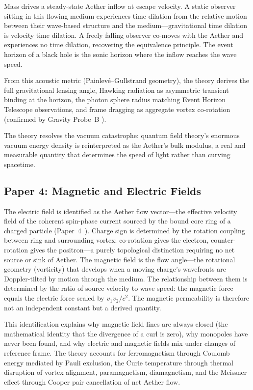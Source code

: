 \documentclass[12pt,letterpaper]{article}
\begin{document}
Mass drives a steady-state Aether inflow at escape velocity.  A static observer
sitting in this flowing medium experiences time dilation from the relative motion
between their wave-based structure and the medium---gravitational time dilation is
velocity time dilation.  A freely falling observer co-moves with the Aether and
experiences no time dilation, recovering the equivalence principle.  The event horizon
of a black hole is the sonic horizon where the inflow reaches the wave speed.

From this acoustic metric (Painlev\'e--Gullstrand geometry), the theory derives the
full gravitational lensing angle, Hawking radiation as asymmetric transient binding
at the horizon, the photon sphere radius matching Event Horizon Telescope observations,
and frame dragging as aggregate vortex co-rotation (confirmed by Gravity Probe~B
\cite{everitt2011}).

The theory resolves the vacuum catastrophe: quantum field theory's enormous vacuum
energy density is reinterpreted as the Aether's bulk modulus, a real and measurable
quantity that determines the speed of light rather than curving spacetime.


\subsection{Paper 4: Magnetic and Electric Fields}

The electric field is identified as the Aether flow vector---the effective
velocity field of the coherent spin-phase current sourced by the bound core
ring of a charged particle (Paper~4~\cite{otto-em}).  Charge sign is determined by the
rotation coupling between ring and surrounding vortex: co-rotation gives the electron,
counter-rotation gives the positron---a purely topological distinction requiring no
net source or sink of Aether.  The magnetic field is the flow angle---the rotational
geometry (vorticity) that develops when a moving charge's wavefronts are
Doppler-tilted by motion through the medium.  The relationship between them is
determined by the ratio of source velocity to wave speed: the magnetic force equals
the electric force scaled by $v_1 v_2/c^2$.  The magnetic permeability is therefore
not an independent constant but a derived quantity.

This identification explains why magnetic field lines are always closed
(the mathematical identity that the divergence of a curl is zero), why monopoles
have never been found, and why electric and magnetic fields mix under changes of
reference frame.  The theory accounts for ferromagnetism through Coulomb energy
mediated by Pauli exclusion, the Curie temperature through thermal disruption
of vortex alignment, paramagnetism, diamagnetism, and the Meissner effect through
Cooper pair cancellation of net Aether flow.
\end{document}

